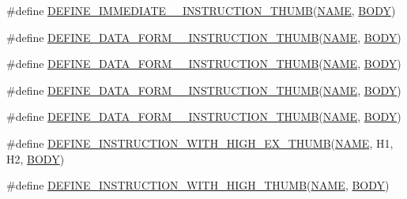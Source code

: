 \begin{DoxyCompactItemize}
\item 
\#define \mbox{\hyperlink{isa-thumb_8c_a15901896db15b9151d225d7725df9a91}{D\+E\+F\+I\+N\+E\+\_\+\+I\+M\+M\+E\+D\+I\+A\+T\+E\+\_\+\_\+\+I\+N\+S\+T\+R\+U\+C\+T\+I\+O\+N\+\_\+\+T\+H\+U\+MB}}(\mbox{\hyperlink{inflate_8h_a164ea0159d5f0b5f12a646f25f99eceaa67bc2ced260a8e43805d2480a785d312}{N\+A\+ME}},  \mbox{\hyperlink{gzlog_8c_aa6bdf6a6d9916c343e1e17774d84a156}{B\+O\+DY}})
\item 
\#define \mbox{\hyperlink{isa-thumb_8c_aca0491677baa5116f295e8b0eb8632db}{D\+E\+F\+I\+N\+E\+\_\+\+D\+A\+T\+A\+\_\+\+F\+O\+R\+M\+\_\+\_\+\+I\+N\+S\+T\+R\+U\+C\+T\+I\+O\+N\+\_\+\+T\+H\+U\+MB}}(\mbox{\hyperlink{inflate_8h_a164ea0159d5f0b5f12a646f25f99eceaa67bc2ced260a8e43805d2480a785d312}{N\+A\+ME}},  \mbox{\hyperlink{gzlog_8c_aa6bdf6a6d9916c343e1e17774d84a156}{B\+O\+DY}})
\item 
\#define \mbox{\hyperlink{isa-thumb_8c_a15f12dff40c028a3f6debe9363926466}{D\+E\+F\+I\+N\+E\+\_\+\+D\+A\+T\+A\+\_\+\+F\+O\+R\+M\+\_\+\_\+\+I\+N\+S\+T\+R\+U\+C\+T\+I\+O\+N\+\_\+\+T\+H\+U\+MB}}(\mbox{\hyperlink{inflate_8h_a164ea0159d5f0b5f12a646f25f99eceaa67bc2ced260a8e43805d2480a785d312}{N\+A\+ME}},  \mbox{\hyperlink{gzlog_8c_aa6bdf6a6d9916c343e1e17774d84a156}{B\+O\+DY}})
\item 
\#define \mbox{\hyperlink{isa-thumb_8c_a9ff704d6520de5f2e4c9b1f73f69edce}{D\+E\+F\+I\+N\+E\+\_\+\+D\+A\+T\+A\+\_\+\+F\+O\+R\+M\+\_\+\_\+\+I\+N\+S\+T\+R\+U\+C\+T\+I\+O\+N\+\_\+\+T\+H\+U\+MB}}(\mbox{\hyperlink{inflate_8h_a164ea0159d5f0b5f12a646f25f99eceaa67bc2ced260a8e43805d2480a785d312}{N\+A\+ME}},  \mbox{\hyperlink{gzlog_8c_aa6bdf6a6d9916c343e1e17774d84a156}{B\+O\+DY}})
\item 
\#define \mbox{\hyperlink{isa-thumb_8c_aed065a01fc49f94adc94fbae3fe8ada1}{D\+E\+F\+I\+N\+E\+\_\+\+D\+A\+T\+A\+\_\+\+F\+O\+R\+M\+\_\+\_\+\+I\+N\+S\+T\+R\+U\+C\+T\+I\+O\+N\+\_\+\+T\+H\+U\+MB}}(\mbox{\hyperlink{inflate_8h_a164ea0159d5f0b5f12a646f25f99eceaa67bc2ced260a8e43805d2480a785d312}{N\+A\+ME}},  \mbox{\hyperlink{gzlog_8c_aa6bdf6a6d9916c343e1e17774d84a156}{B\+O\+DY}})
\item 
\#define \mbox{\hyperlink{isa-thumb_8c_ab899da842835d2ec664c1a915eee22e1}{D\+E\+F\+I\+N\+E\+\_\+\+I\+N\+S\+T\+R\+U\+C\+T\+I\+O\+N\+\_\+\+W\+I\+T\+H\+\_\+\+H\+I\+G\+H\+\_\+\+E\+X\+\_\+\+T\+H\+U\+MB}}(\mbox{\hyperlink{inflate_8h_a164ea0159d5f0b5f12a646f25f99eceaa67bc2ced260a8e43805d2480a785d312}{N\+A\+ME}},  H1,  H2,  \mbox{\hyperlink{gzlog_8c_aa6bdf6a6d9916c343e1e17774d84a156}{B\+O\+DY}})
\item 
\#define \mbox{\hyperlink{isa-thumb_8c_a9a6bceac0b85e7d13a8555e219406827}{D\+E\+F\+I\+N\+E\+\_\+\+I\+N\+S\+T\+R\+U\+C\+T\+I\+O\+N\+\_\+\+W\+I\+T\+H\+\_\+\+H\+I\+G\+H\+\_\+\+T\+H\+U\+MB}}(\mbox{\hyperlink{inflate_8h_a164ea0159d5f0b5f12a646f25f99eceaa67bc2ced260a8e43805d2480a785d312}{N\+A\+ME}},  \mbox{\hyperlink{gzlog_8c_aa6bdf6a6d9916c343e1e17774d84a156}{B\+O\+DY}})

\end{DoxyCompactItemize}
